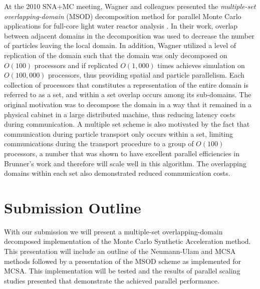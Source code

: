 \documentclass{snamc2013}
\begin{document}
At the 2010 SNA+MC meeting, Wagner and colleagues presented the
\textit{multiple-set overlapping-domain} (MSOD) decomposition method
for parallel Monte Carlo applications for full-core light water
reactor analysis \cite{wagner_hybrid_2010}. In their work, overlap
between adjacent domains in the decomposition was used to decrease the
number of particles leaving the local domain. In addition, Wagner
utilized a level of replication of the domain such that the domain was
only decomposed on $O(100)$ processors and if replicated $O(1,000)$
times achieves simulation on $O(100,000)$ processors, thus providing
spatial and particle parallelism. Each collection of processors that
constitutes a representation of the entire domain is referred to as a
set, and within a set overlap occurs among its sub-domains. The
original motivation was to decompose the domain in a way that it
remained in a physical cabinet in a large distributed machine, thus
reducing latency costs during communication. A multiple set scheme is
also motivated by the fact that communication during particle
transport only occurs within a set, limiting communications during the
transport procedure to a group of $O(100)$ processors, a number that
was shown to have excellent parallel efficiencies in Brunner's work
\cite{brunner_efficient_2009} and therefore will scale well in this
algorithm. The overlapping domains within each set also demonstrated
reduced communication costs.

\section{Submission Outline}

With our submission we will present a multiple-set overlapping-domain
decomposed implementation of the Monte Carlo Synthetic Acceleration
method. This presentation will include an outline of the Neumann-Ulam
and MCSA methods followed by a presentation of the MSOD scheme as
implemented for MCSA. This implementation will be tested and the
results of parallel scaling studies presented that demonstrate the
achieved parallel performance.



\end{document}
